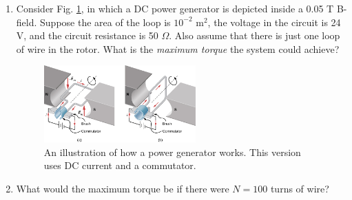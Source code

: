 \documentclass{article}
\begin{document}
\begin{enumerate}
\item Consider Fig. \ref{fig:lorentz}, in which a DC power generator is depicted inside a 0.05 T B-field.  Suppose the area of the loop is $10^{-2}$ m$^{2}$, the voltage in the circuit is 24 V, and the circuit resistance is 50 $\Omega$.  Also assume that there is just one loop of wire in the rotor.  What is the \textit{maximum torque} the system could achieve? \\ \vspace{2cm}
\begin{figure}[ht]
\centering
\includegraphics[width=0.55\textwidth]{commute.jpeg}
\caption{\label{fig:lorentz} An illustration of how a power generator works.  This version uses DC current and a commutator.}
\end{figure}
\item What would the maximum torque be if there were $N = 100$ turns of wire?
\end{enumerate}
\end{document}
